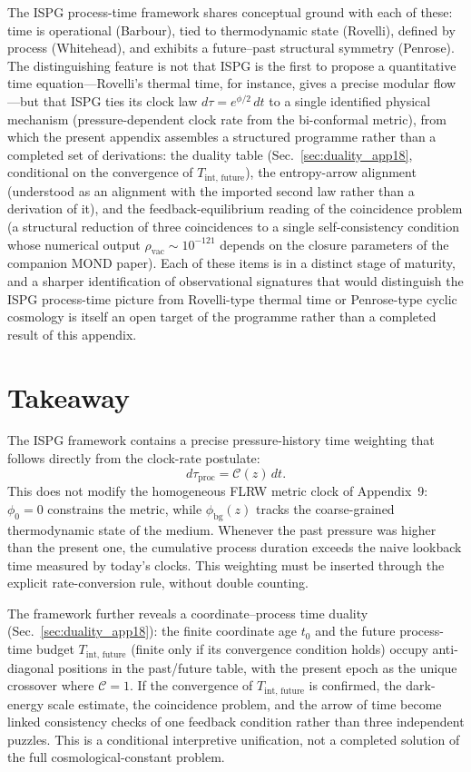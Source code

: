 \documentclass[11pt]{article}
\begin{document}
The ISPG process-time framework shares conceptual ground with
each of these: time is operational (Barbour), tied to
thermodynamic state (Rovelli), defined by process (Whitehead),
and exhibits a future--past structural symmetry (Penrose).
The distinguishing feature is not that ISPG is the first to
propose a quantitative time equation---Rovelli's thermal time,
for instance, gives a precise modular flow---but that ISPG
ties its clock law $d\tau = e^{\phi/2}\,dt$ to a single
identified physical mechanism (pressure-dependent clock rate
from the bi-conformal metric), from which the present appendix
assembles a structured programme rather than a completed set of
derivations: the duality table
(Sec.~\ref{sec:duality_app18}, conditional on the convergence of
$T_{\mathrm{int,\,future}}$), the entropy-arrow alignment
(understood as an alignment with the imported second law rather
than a derivation of it), and the feedback-equilibrium reading of
the coincidence problem (a structural reduction of three
coincidences to a single self-consistency condition whose
numerical output $\rho_{\mathrm{vac}}\sim 10^{-121}$ depends on the
closure parameters of the companion MOND paper).  Each of these
items is in a distinct stage of maturity, and a sharper
identification of observational signatures that would distinguish
the ISPG process-time picture from Rovelli-type thermal time or
Penrose-type cyclic cosmology is itself an open target of the
programme rather than a completed result of this appendix.

\section{Takeaway}
\label{sec:takeaway_app18}

The ISPG framework contains a precise pressure-history time weighting that
follows directly from the clock-rate postulate:
\begin{equation}
  d\tau_{\mathrm{proc}} = \mathcal{C}(z)\,dt.
\end{equation}
This does not modify the homogeneous FLRW metric clock of Appendix~9:
$\phi_0=0$ constrains the metric, while $\phi_{\mathrm{bg}}(z)$ tracks
the coarse-grained thermodynamic state of the medium.  Whenever the past
pressure was higher than the present one, the cumulative process duration
exceeds the naive lookback time measured by today's clocks.  This weighting
must be inserted through the explicit rate-conversion rule, without double
counting.

The framework further reveals a coordinate--process time duality
(Sec.~\ref{sec:duality_app18}): the finite coordinate age $t_0$ and
the future process-time budget
$T_{\mathrm{int,\,future}}$ (finite only if its convergence condition
holds) occupy anti-diagonal positions in the
past/future table, with the present epoch as the unique crossover
where $\mathcal{C}=1$.  If the convergence of $T_{\mathrm{int,\,future}}$
is confirmed, the dark-energy scale estimate, the coincidence problem,
and the arrow of time become linked consistency checks of one feedback
condition rather than three independent puzzles.  This is a conditional
interpretive unification, not a completed solution of the full
cosmological-constant problem.
\end{document}
